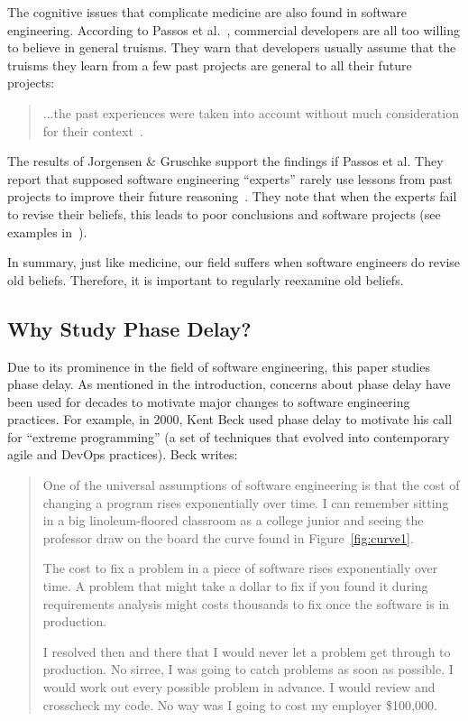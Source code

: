 \documentclass{sig-alternate}
\newcommand{\fig}[1]{Figure~\ref{fig:#1}}
\begin{document}
The cognitive issues that complicate medicine are also found in software engineering.
According to Passos et al.~\cite{passos11}, commercial developers
are all too willing to believe in general
truisms.
They  warn that developers
usually assume that the truisms they learn from a few past
projects are general to 
all their future projects:
\begin{quote}\label{q:pass}
...the past experiences were taken into account without 
much consideration for their context~\cite{passos11}.  
\end{quote}
The results of Jorgensen \& Gruschke support the findings if Passos et al. They report that 
  supposed software engineering    ``experts'' rarely use lessons
  from past projects to improve their future reasoning~\cite{jorgensen09}. 
 They note that
when the experts
  fail to revise their beliefs, this leads to poor
 conclusions and software projects  (see examples in~\cite{jorgensen09}).

In summary, just like medicine, our field suffers when
 software engineers do  revise old beliefs.  Therefore, it is important
 to regularly  reexamine    old beliefs.
\subsection{Why Study Phase Delay?}
Due to its prominence in the field of software engineering,
this paper studies phase delay. As mentioned in the introduction, concerns about phase delay have
been used for decades to motivate major changes to software engineering practices. For example,
in 2000, Kent Beck used phase delay to motivate his call for ``extreme programming'' (a set of techniques
that evolved into contemporary agile and DevOps practices). Beck writes:
\begin{quote}
One of the universal assumptions of software engineering is that the cost of changing a program rises exponentially over time. I can remember sitting in a big linoleum-floored classroom as a college junior and seeing the professor draw on the board the curve found in \fig{curve1}.

The cost to fix a problem in a piece of software rises exponentially over time. A problem that might take a dollar to fix if you found it during requirements analysis might costs thousands to fix once the software is in production.

I resolved then and there that I would never let a problem get through to production. No sirree, I was going to catch problems as soon as possible. I would work out every possible problem in advance. I would review and crosscheck my code. No way was I going to cost my employer \$100,000.~\cite{beck00}
\end{quote}
\end{document}

